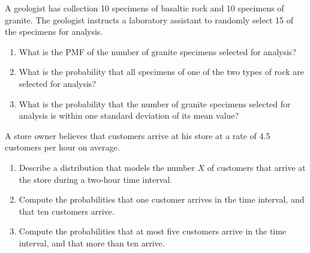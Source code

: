 \documentclass[12pt,reqno]{amsart}
\begin{document}
\bigskip
\prob A geologist has collection 10 specimens of basaltic rock and 10 specimens of granite. The geologist instructs a laboratory assistant to randomly select 15 of the specimens for analysis.

\medskip
\begin{enumerate}
\item What is the PMF of the number of granite specimens selected for analysis?\vfill



\item What is the probability that all specimens of one of the two types of rock are selected for analysis?\vfill



\item What is the probability that the number of granite specimens selected for analysis is within one standard deviation of its mean value?\vfill



\end{enumerate}


















\newpage
\prob A store owner believes that customers arrive at his store at a rate of 4.5 customers per hour on average.

\medskip
\begin{enumerate}
\item Describe a distribution that models the number $X$ of customers that arrive at the store during a two-hour time interval.\vfill



\item Compute the probabilities that one customer arrives in the time interval, and that ten customers arrive.\vfill



\item Compute the probabilities that at most five customers arrive in the time interval, and that more than ten arrive.\vfill


\end{enumerate}
\end{document}
